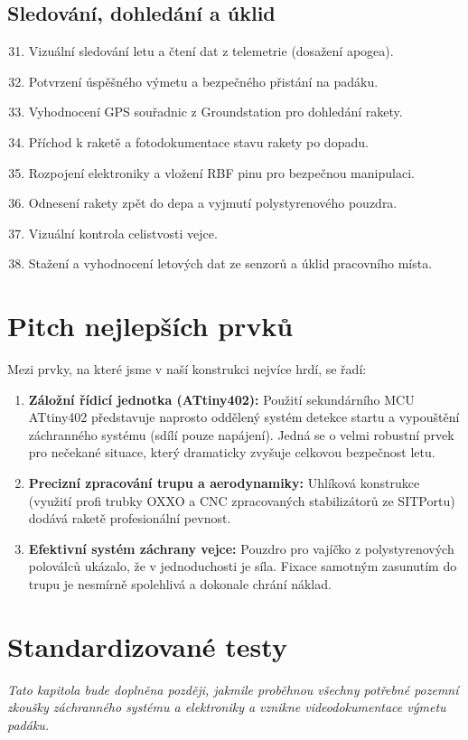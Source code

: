 \documentclass[a4paper,12pt]{article}
\begin{document}
\subsection*{Sledování, dohledání a úklid}
\begin{enumerate}
    \setcounter{enumi}{30}
    \item Vizuální sledování letu a čtení dat z telemetrie (dosažení apogea).
    \item Potvrzení úspěšného výmetu a bezpečného přistání na padáku.
    \item Vyhodnocení GPS souřadnic z Groundstation pro dohledání rakety.
    \item Příchod k raketě a fotodokumentace stavu rakety po dopadu.
    \item Rozpojení elektroniky a vložení RBF pinu pro bezpečnou manipulaci.
    \item Odnesení rakety zpět do depa a vyjmutí polystyrenového pouzdra.
    \item Vizuální kontrola celistvosti vejce.
    \item Stažení a vyhodnocení letových dat ze senzorů a úklid pracovního místa.
\end{enumerate}

\section{Pitch nejlepších prvků}
Mezi prvky, na které jsme v naší konstrukci nejvíce hrdí, se řadí:
\begin{enumerate}
    \item \textbf{Záložní řídicí jednotka (ATtiny402):} Použití sekundárního MCU ATtiny402 představuje naprosto oddělený systém detekce startu a vypouštění záchranného systému (sdílí pouze napájení). Jedná se o velmi robustní prvek pro nečekané situace, který dramaticky zvyšuje celkovou bezpečnost letu.
    \item \textbf{Precizní zpracování trupu a aerodynamiky:} Uhlíková konstrukce (využití profi trubky OXXO a CNC zpracovaných stabilizátorů ze SITPortu) dodává raketě profesionální pevnost.
    \item \textbf{Efektivní systém záchrany vejce:} Pouzdro pro vajíčko z polystyrenových poloválců ukázalo, že v jednoduchosti je síla. Fixace samotným zasunutím do trupu je nesmírně spolehlivá a dokonale chrání náklad.
\end{enumerate}

\section{Standardizované testy}
\textit{Tato kapitola bude doplněna později, jakmile proběhnou všechny potřebné pozemní zkoušky záchranného systému a elektroniky a vznikne videodokumentace výmetu padáku.}
\end{document}

